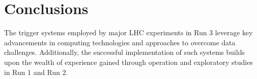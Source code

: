 \section{Conclusions}
The trigger systems employed by major LHC experiments in Run 3 leverage key advancements in computing technologies and approaches to overcome data challenges. Additionally, the successful implementation of such systems builds upon the wealth of experience gained through operation and exploratory studies in Run 1 and Run 2. %